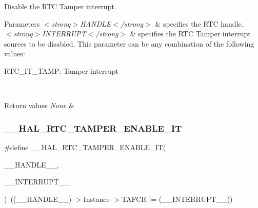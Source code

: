Disable the R\+TC Tamper interrupt. 


\begin{DoxyParams}{Parameters}
{\em $<$strong$>$\+H\+A\+N\+D\+L\+E$<$/strong$>$} & specifies the R\+TC handle. \\
\hline
{\em $<$strong$>$\+I\+N\+T\+E\+R\+R\+U\+P\+T$<$/strong$>$} & specifies the R\+TC Tamper interrupt sources to be disabled. This parameter can be any combination of the following values\+: \begin{DoxyItemize}
\item R\+T\+C\+\_\+\+I\+T\+\_\+\+T\+A\+MP\+: Tamper interrupt \end{DoxyItemize}
\\
\hline
\end{DoxyParams}

\begin{DoxyRetVals}{Return values}
{\em None} & \\
\hline
\end{DoxyRetVals}
\mbox{\label{group___r_t_c_ex___tamper_ga5897843380c7fcf865131c6bdb0fc3a1}} 
\subsubsection{\texorpdfstring{\+\_\+\+\_\+\+H\+A\+L\+\_\+\+R\+T\+C\+\_\+\+T\+A\+M\+P\+E\+R\+\_\+\+E\+N\+A\+B\+L\+E\+\_\+\+IT}{\_\_HAL\_RTC\_TAMPER\_ENABLE\_IT}}
{\footnotesize\ttfamily \#define \+\_\+\+\_\+\+H\+A\+L\+\_\+\+R\+T\+C\+\_\+\+T\+A\+M\+P\+E\+R\+\_\+\+E\+N\+A\+B\+L\+E\+\_\+\+IT(\begin{DoxyParamCaption}\item[{}]{\+\_\+\+\_\+\+H\+A\+N\+D\+L\+E\+\_\+\+\_\+,  }\item[{}]{\+\_\+\+\_\+\+I\+N\+T\+E\+R\+R\+U\+P\+T\+\_\+\+\_\+ }\end{DoxyParamCaption})~((\+\_\+\+\_\+\+H\+A\+N\+D\+L\+E\+\_\+\+\_\+)-\/$>$Instance-\/$>$T\+A\+F\+CR $\vert$= (\+\_\+\+\_\+\+I\+N\+T\+E\+R\+R\+U\+P\+T\+\_\+\+\_\+))}



